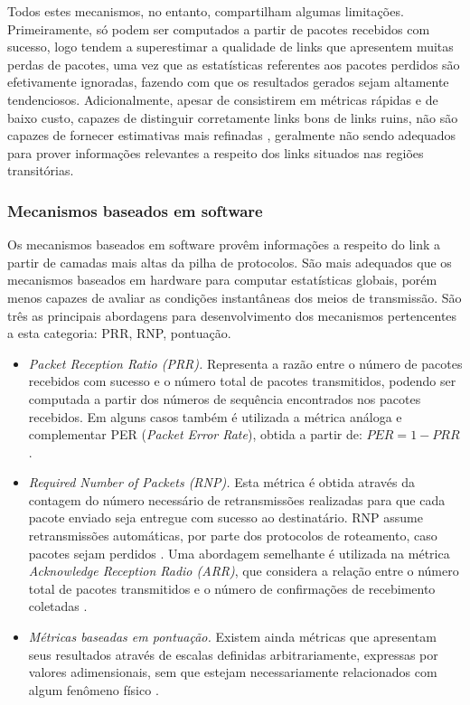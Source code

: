 \documentclass[
	12pt,				%
	openright,			%
	oneside,
	a4paper,			%
	english,			%
	french,				%
	spanish,			%
	brazil				%
	]{abntex2}
\begin{document}
	Todos estes mecanismos, no entanto, compartilham algumas limitações. Primeiramente, só podem ser computados a partir de pacotes recebidos com sucesso, logo tendem a superestimar a qualidade de links que apresentem muitas perdas de pacotes, uma vez que as estatísticas referentes aos pacotes perdidos são efetivamente ignoradas, fazendo com que os resultados gerados sejam altamente tendenciosos. Adicionalmente, apesar de consistirem em métricas rápidas e de baixo custo, capazes de distinguir corretamente links bons de links ruins, não são capazes de fornecer estimativas mais refinadas \cite{Baccour2012}, geralmente não sendo adequados para prover informações relevantes a respeito dos links situados nas regiões transitórias.
	
\subsubsection{Mecanismos baseados em software}

Os mecanismos baseados em software provêm informações a respeito do link a partir de camadas mais altas da pilha de protocolos. São mais adequados que os mecanismos baseados em hardware para computar estatísticas globais, porém menos capazes de avaliar as condições instantâneas dos meios de transmissão. São três as principais abordagens para desenvolvimento dos mecanismos pertencentes a esta categoria: PRR, RNP, pontuação.

\begin{itemize}
	\item \textit{Packet Reception Ratio (PRR).} Representa a razão entre o número de pacotes recebidos com sucesso e o número total de pacotes transmitidos, podendo ser computada a partir dos números de sequência encontrados nos pacotes recebidos. Em alguns casos também é utilizada a métrica análoga e complementar PER (\textit{Packet Error Rate}), obtida a partir de: $PER = 1 - PRR$ \cite{Baccour2012}.
	\item \textit{Required Number of Packets (RNP).} Esta métrica é obtida através da contagem do número necessário de retransmissões realizadas para que cada pacote enviado seja entregue com sucesso ao destinatário. RNP assume retransmissões automáticas, por parte dos protocolos de roteamento, caso pacotes sejam perdidos \cite{Cerpa2005}. Uma abordagem semelhante é utilizada na métrica \textit{Acknowledge Reception Radio (ARR)}, que considera a relação entre o número total de pacotes transmitidos e o número de confirmações de recebimento coletadas \cite{Baccour2012}.
	\item \textit{Métricas baseadas em pontuação.} Existem ainda métricas que apresentam seus resultados através de escalas definidas arbitrariamente, expressas por valores adimensionais, sem que estejam necessariamente relacionados com algum fenômeno físico \cite{Baccour2012}.
\end{itemize}
\end{document}

